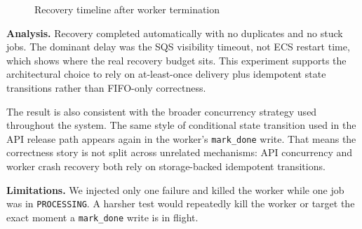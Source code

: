 \documentclass[10pt,letterpaper]{article}
\newcommand{\code}[1]{\texttt{\small #1}}
\begin{document}
\begin{figure}[H]
\centering
{}
\caption{Recovery timeline after worker termination}
\end{figure}

\begin{resultbox}
\textbf{Analysis.} Recovery completed automatically with no duplicates and no stuck jobs. The dominant delay was the SQS visibility timeout, not ECS restart time, which shows where the real recovery budget sits. This experiment supports the architectural choice to rely on at-least-once delivery plus idempotent state transitions rather than FIFO-only correctness.

The result is also consistent with the broader concurrency strategy used throughout the system. The same style of conditional state transition used in the API release path appears again in the worker's \code{mark\_done} write. That means the correctness story is not split across unrelated mechanisms: API concurrency and worker crash recovery both rely on storage-backed idempotent transitions.
\end{resultbox}

\begin{limitbox}
\textbf{Limitations.} We injected only one failure and killed the worker while one job was in \texttt{PROCESSING}. A harsher test would repeatedly kill the worker or target the exact moment a \code{mark\_done} write is in flight.
\end{limitbox}
\end{document}
